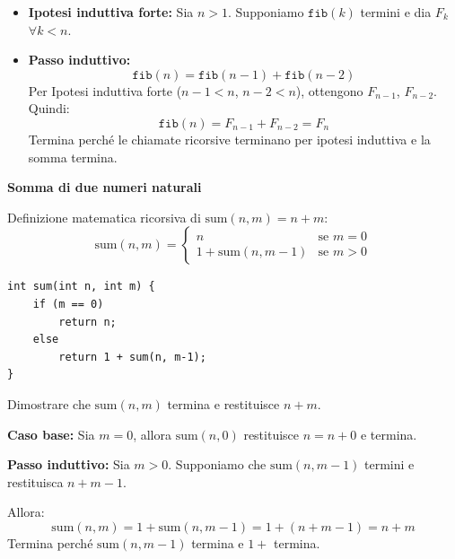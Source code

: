 \begin{esempio}
\begin{itemize}
    \item \textbf{Ipotesi induttiva forte:} Sia $n>1$. Supponiamo $\texttt{fib}(k)$ termini e dia $F_k$ $\forall k<n$.
    
    \item \textbf{Passo induttivo:} 
    \[
    \texttt{fib}(n) = \texttt{fib}(n-1) + \texttt{fib}(n-2)
    \]
    Per Ipotesi induttiva forte ($n-1<n$, $n-2<n$), ottengono $F_{n-1}$, $F_{n-2}$. Quindi:
    \[
    \texttt{fib}(n) = F_{n-1} + F_{n-2} = F_n
    \]
    Termina perché le chiamate ricorsive terminano per ipotesi induttiva e la somma termina.
\end{itemize}




\end{esempio}













\begin{esempio}
\textbf{Somma di due numeri naturali}

Definizione matematica ricorsiva di $\text{sum}(n,m) = n + m$:
\[
\text{sum}(n,m) = 
\begin{cases}
n & \text{se } m = 0 \\
1 + \text{sum}(n,m-1) & \text{se } m > 0
\end{cases}
\]

\begin{tcolorbox}[
    colback=backcolour, 
    colframe=framegray, 
    boxrule=0.5pt, 
    sharp corners,
    left=5mm, right=5mm, 
    top=5mm, bottom=5mm,
    width=\linewidth
]
\begin{lstlisting}[commentstyle=\color{codegray}]
int sum(int n, int m) {
    if (m == 0)
        return n;
    else
        return 1 + sum(n, m-1);
}
\end{lstlisting}
\end{tcolorbox}

 Dimostrare che $\text{sum}(n,m)$ termina e restituisce $n+m$.


\textbf{Caso base:} Sia $m=0$, allora $\text{sum}(n,0)$ restituisce $n=n+0$ e termina.

\textbf{Passo induttivo:} Sia $m>0$. Supponiamo che $\text{sum}(n,m-1)$ termini e restituisca $n+m-1$.

Allora:
\[
\text{sum}(n,m)=1+\text{sum}(n,m-1)=1+(n+m-1)=n+m
\]
Termina perché $\text{sum}(n,m-1)$ termina e $1+$ termina.


\end{esempio}


